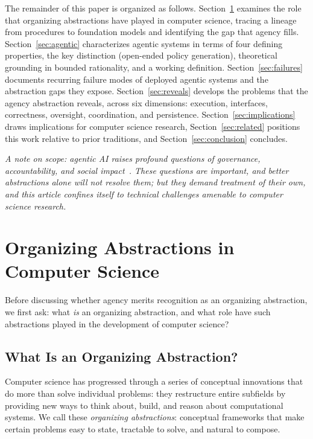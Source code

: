 \documentclass[11pt]{article}
\begin{document}
The remainder of this paper is organized as follows. Section~\ref{sec:abstractions} examines the role that organizing abstractions have played in computer science, tracing a lineage from procedures to foundation models and identifying the gap that agency fills. Section~\ref{sec:agentic} characterizes agentic systems in terms of four defining properties, the key distinction (open-ended policy generation), theoretical grounding in bounded rationality, and a working definition. Section~\ref{sec:failures} documents recurring failure modes of deployed agentic systems and the abstraction gaps they expose. Section~\ref{sec:reveals} develops the problems that the agency abstraction reveals, across six dimensions: execution, interfaces, correctness, oversight, coordination, and persistence. Section~\ref{sec:implications} draws implications for computer science research, Section~\ref{sec:related} positions this work relative to prior traditions, and Section~\ref{sec:conclusion} concludes.

\emph{A note on scope: agentic AI raises profound questions of governance, accountability, and social impact~\cite{singapore_consensus}. These questions are important, and better abstractions alone will not resolve them; but they demand treatment of their own, and this article confines itself to technical challenges amenable to computer science research.}

\section{Organizing Abstractions in Computer Science}
\label{sec:abstractions}

Before discussing whether agency merits recognition as an organizing abstraction, we first ask: what \textit{is} an organizing abstraction, and what role have such abstractions played in the development of computer science?

\subsection{What Is an Organizing Abstraction?}

Computer science has progressed through a series of conceptual innovations that do more than solve individual problems: they restructure entire subfields by providing new ways to think about, build, and reason about computational systems. We call these \textit{organizing abstractions}: conceptual frameworks that make certain problems easy to state, tractable to solve, and natural to compose.
\end{document}
